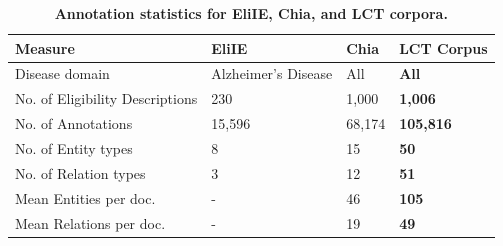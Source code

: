 \documentclass[../main.tex]{subfiles}
\begin{document}
\begin{table}
\centering
\begin{tabular}{l|lll} 
 \toprule
 Measure & EliIE \cite{kang2017eliie} & Chia \cite{kury2020chia} & \textbf{LCT Corpus} \\
 \hline
    Disease domain & Alzheimer's Disease & All & \textbf{All} \\
    No. of Eligibility Descriptions & 230 & 1,000 & \textbf{1,006} \\
    No. of Annotations & 15,596 & 68,174 & \textbf{105,816} \\
    No. of Entity types & 8 & 15 & \textbf{50} \\
    No. of Relation types & 3 & 12 & \textbf{51} \\
    Mean Entities per doc. & - & 46 & \textbf{105} \\
    Mean Relations per doc. & - & 19 & \textbf{49} \\
 \hline
\end{tabular}
\caption{\textbf{Annotation statistics for EliIE, Chia, and LCT corpora.}}
\label{tbl_corpora_compare}
\end{table}
\end{document}
